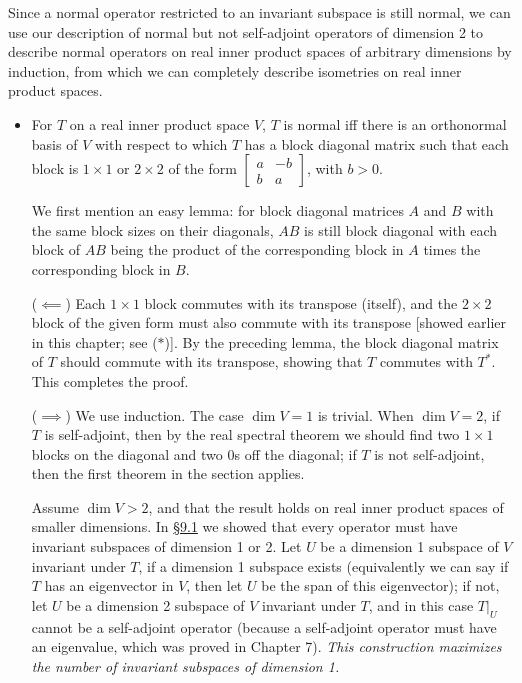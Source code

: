 \documentclass[11pt]{article}
\newcommand{\lk}[2]{\hyperlink{subsection.#1.#2}{\S#1.#2}}
\renewcommand{\d}{\dim}
\begin{document}
Since a normal operator restricted to an invariant subspace is still normal, we can use our description of normal but not self-adjoint operators of dimension 2 to describe normal operators on real inner product spaces of arbitrary dimensions by induction, from which we can completely describe isometries on real inner product spaces.
\begin{itemize}
    \item For $T$ on a real inner product space $V$, $T$ is normal iff there is an orthonormal basis of $V$ with respect to which $T$ has a block diagonal matrix such that each block is $1 \times 1$ or $2 \times 2$ of the form $\begin{bmatrix}
        a & -b \\ b & a
    \end{bmatrix}$, with $b > 0$.
    
    We first mention an easy lemma: for block diagonal matrices $A$ and $B$ with the same block sizes on their diagonals, $AB$ is still block diagonal with each block of $AB$ being the product of the corresponding block in $A$ times the corresponding block in $B$.
    
    ($\impliedby$) Each $1 \times 1$ block commutes with its transpose (itself), and the $2 \times 2$ block of the given form must also commute with its transpose [showed earlier in this chapter; see ($\ast$)]. By the preceding lemma, the block diagonal matrix of $T$ should commute with its transpose, showing that $T$ commutes with $T^*$. This completes the proof.
    
    ($\implies$) We use induction. The case $\d V = 1$ is trivial. When $\d V = 2$, if $T$ is self-adjoint, then by the real spectral theorem we should find two $1 \times 1$ blocks on the diagonal and two 0s off the diagonal; if $T$ is not self-adjoint, then the first theorem in the section applies.
    
    Assume $\d V > 2$, and that the result holds on real inner product spaces of smaller dimensions. In \lk{9}{1} we showed that every operator must have invariant subspaces of dimension 1 or 2. Let $U$ be a dimension 1 subspace of $V$ invariant under $T$, if a dimension 1 subspace exists (equivalently we can say if $T$ has an eigenvector in $V$, then let $U$ be the span of this eigenvector); if not, let $U$ be a dimension 2 subspace of $V$ invariant under $T$, and in this case $T|_U$ cannot be a self-adjoint operator (because a self-adjoint operator must have an eigenvalue, which was proved in Chapter 7). \emph{This construction maximizes the number of invariant subspaces of dimension 1.}
    

\end{itemize}
\end{document}
